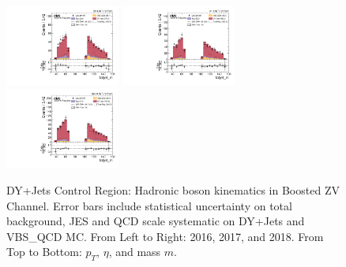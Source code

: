 \begin{figure}[!ht]
  \includegraphics[width=0.335\textwidth]{analysis_plots/2016_zv/cr_vjets_l/fatjet_m.pdf} \hspace{-10pt}
  \includegraphics[width=0.335\textwidth]{analysis_plots/2017_zv/cr_vjets_l/fatjet_m.pdf} \hspace{-10pt}
  \includegraphics[width=0.335\textwidth]{analysis_plots/2018_zv/cr_vjets_l/fatjet_m.pdf} \hspace{-10pt} \\
  \caption[DY+Jets Control Region: Hadronic boson kinematics in Boosted ZV Channel]%
  {DY+Jets Control Region: Hadronic boson kinematics in Boosted ZV Channel.
    Error bars include statistical uncertainty on total background,
    JES and QCD scale systematic on DY+Jets and VBS\_QCD MC\@. From Left to Right: 2016,
    2017, and 2018. From Top to Bottom: \( p_T \), \( \eta \), and mass \( m \).}%
  \label{fig:zv-cr-vjets-l-fatjet-pt-eta-m}
\end{figure}

